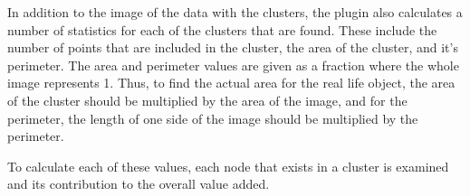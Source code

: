 In addition to the image of the data with the clusters, the plugin also
calculates a number of statistics for each of the clusters that are found.
These include the number of points that are included in the cluster, the area
of the cluster, and it's perimeter. The area and perimeter values are given as
a fraction where the whole image represents 1. Thus, to find the actual area
for the real life object, the area of the cluster should be multiplied by the
area of the image, and for the perimeter, the length of one side of the image
should be multiplied by the perimeter.

To calculate each of these values, each node that exists in a cluster is
examined and its contribution to the overall value added.
